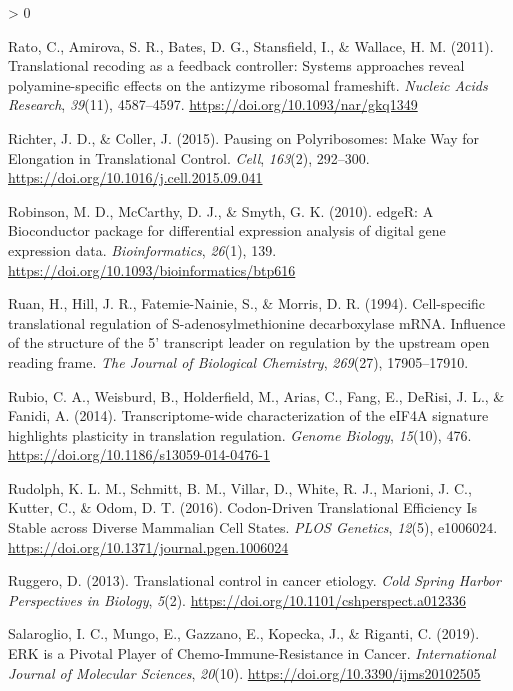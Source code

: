 \documentclass[
  12pt,
  openany]{book}
\newlength{\cslhangindent}
\newenvironment{CSLReferences}[2] %
 {%
  \setlength{\parindent}{0pt}
  \ifodd #1 \everypar{\setlength{\hangindent}{\cslhangindent}}\ignorespaces\fi
  \ifnum #2 > 0
  \setlength{\parskip}{#2\baselineskip}
  \fi
 }%
 {}
\begin{document}
\begin{CSLReferences}{1}{0}
\leavevmode\hypertarget{ref-Rato2011}{}%
Rato, C., Amirova, S. R., Bates, D. G., Stansfield, I., \& Wallace, H. M. (2011). Translational recoding as a feedback controller: Systems approaches reveal polyamine-specific effects on the antizyme ribosomal frameshift. \emph{Nucleic Acids Research}, \emph{39}(11), 4587--4597. \url{https://doi.org/10.1093/nar/gkq1349}

\leavevmode\hypertarget{ref-Richter2015}{}%
Richter, J. D., \& Coller, J. (2015). Pausing on {Polyribosomes}: {Make Way} for {Elongation} in {Translational Control}. \emph{Cell}, \emph{163}(2), 292--300. \url{https://doi.org/10.1016/j.cell.2015.09.041}

\leavevmode\hypertarget{ref-Robinson2010}{}%
Robinson, M. D., McCarthy, D. J., \& Smyth, G. K. (2010). {edgeR}: A {Bioconductor} package for differential expression analysis of digital gene expression data. \emph{Bioinformatics}, \emph{26}(1), 139. \url{https://doi.org/10.1093/bioinformatics/btp616}

\leavevmode\hypertarget{ref-Ruan1994}{}%
Ruan, H., Hill, J. R., Fatemie-Nainie, S., \& Morris, D. R. (1994). Cell-specific translational regulation of {S}-adenosylmethionine decarboxylase {mRNA}. {Influence} of the structure of the 5' transcript leader on regulation by the upstream open reading frame. \emph{The Journal of Biological Chemistry}, \emph{269}(27), 17905--17910.

\leavevmode\hypertarget{ref-Rubio2014}{}%
Rubio, C. A., Weisburd, B., Holderfield, M., Arias, C., Fang, E., DeRisi, J. L., \& Fanidi, A. (2014). Transcriptome-wide characterization of the {eIF4A} signature highlights plasticity in translation regulation. \emph{Genome Biology}, \emph{15}(10), 476. \url{https://doi.org/10.1186/s13059-014-0476-1}

\leavevmode\hypertarget{ref-Rudolph2016}{}%
Rudolph, K. L. M., Schmitt, B. M., Villar, D., White, R. J., Marioni, J. C., Kutter, C., \& Odom, D. T. (2016). Codon-{Driven Translational Efficiency Is Stable} across {Diverse Mammalian Cell States}. \emph{PLOS Genetics}, \emph{12}(5), e1006024. \url{https://doi.org/10.1371/journal.pgen.1006024}

\leavevmode\hypertarget{ref-Ruggero2013}{}%
Ruggero, D. (2013). Translational control in cancer etiology. \emph{Cold Spring Harbor Perspectives in Biology}, \emph{5}(2). \url{https://doi.org/10.1101/cshperspect.a012336}

\leavevmode\hypertarget{ref-Salaroglio2019}{}%
Salaroglio, I. C., Mungo, E., Gazzano, E., Kopecka, J., \& Riganti, C. (2019). {ERK} is a {Pivotal Player} of {Chemo}-{Immune}-{Resistance} in {Cancer}. \emph{International Journal of Molecular Sciences}, \emph{20}(10). \url{https://doi.org/10.3390/ijms20102505}


\end{CSLReferences}
\end{document}
